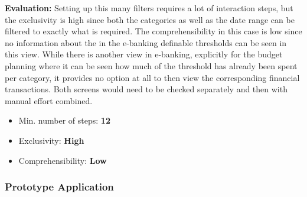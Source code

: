 \textbf{Evaluation:} Setting up this many filters requires a lot of interaction steps, but the exclusivity is high since both the categories as well as the date range can be filtered to exactly what is required. The comprehensibility in this case is low since no information about the in the e-banking definable thresholds can be seen in this view. While there is another view in e-banking, explicitly for the budget planning where it can be seen how much of the threshold has already been spent per category, it provides no option at all to then view the corresponding financial transactions. Both screens would need to be checked separately and then with manual effort combined.
\begin{itemize}[noitemsep,nolistsep]
	\item Min. number of steps: \textbf{12}
	\item Exclusivity: \textbf{High}
	\item Comprehensibility: \textbf{Low}
\end{itemize}



\subsubsection{Prototype Application}

